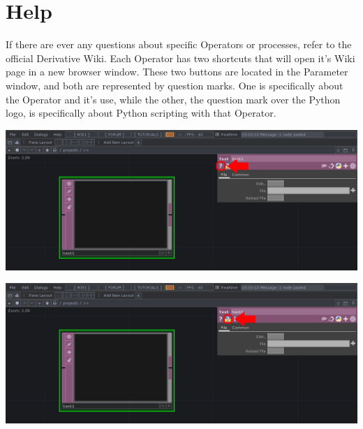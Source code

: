 \section{Help}

\begin{fullwidth}

If there are ever any questions about specific Operators or processes, refer to the official Derivative Wiki. Each Operator has two shortcuts that will open it's Wiki page in a new browser window. These two buttons are located in the Parameter window, and both are represented by question marks. One is specifically about the Operator and it's use, while the other, the question mark over the Python logo, is specifically about Python scripting with that Operator.

\begin{center}
\includegraphics[width=15cm]{./img/1.6/help-1.png}

\includegraphics[width=15cm]{./img/1.6/help-2.png}
\end{center}

\end{fullwidth}


